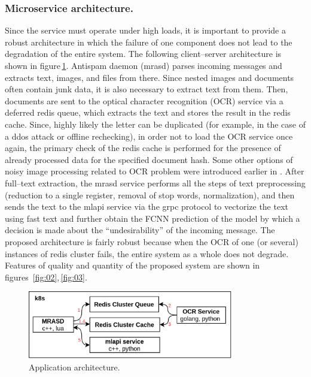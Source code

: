 \documentclass[12pt]{jpconf}
\begin{document}
\subsubsection*{Microservice architecture.}
Since the service must operate under high loads, it is important to provide a robust architecture in which the failure of one component does not lead to the degradation of the entire system. The following client--server architecture is shown in figure\,\ref{fig:01}. Antispam daemon (mrasd) parses incoming messages and extracts text, images, and files from there. Since nested images and documents often contain junk data, it is also necessary to extract text from them. Then, documents are sent to the optical character recognition (OCR) service via a deferred redis queue, which extracts the text and stores the result in the redis cache.
Since, highly likely the letter can be duplicated (for example, in the case of a ddos attack or offline rechecking), in order not to load the OCR service once again, the primary check of the redis cache is performed for the presence of already processed data for the specified document hash.
Some other options of noisy image processing related to OCR problem were introduced earlier in \cite{Churikov2004,Kravchenko2005}.
After full--text extraction, the mrasd service performs all the steps of text preprocessing (reduction to a single register, removal of stop words, normalization), and then sends the text to the mlapi service via the grpc protocol to vectorize the text using fast text and further obtain the FCNN prediction of the model by which a decision is made about the ``undesirability'' of the incoming message.
The proposed architecture is fairly robust because when the OCR of one (or several) instances of redis cluster fails, the entire system as a whole does not degrade. Features of quality and quantity of the proposed system are shown in figures~\ref{fig:02},\,\ref{fig:03}.

\begin{figure}[h]
\center
\includegraphics[width=0.8\textwidth]{images/architecture.jpg}
\caption{\label{fig:01} Application architecture.}
\end{figure}
\end{document}
